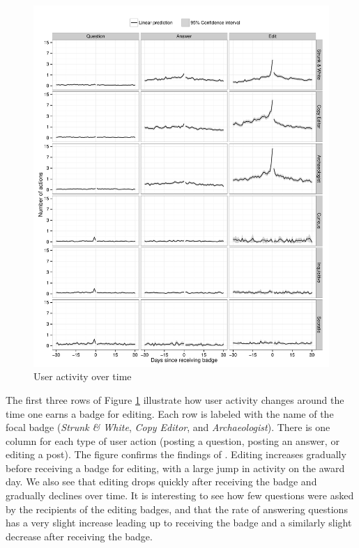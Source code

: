 \documentclass[conference]{IEEEtran}
\newcommand{\1}{\mathds{1}}
\begin{document}
\begin{figure}
  \centering
  \includegraphics[width=\textwidth]{../figures/badges.pdf}
  \caption{User activity over time \label{fig:badges}}
\end{figure}

The first three rows of Figure \ref{fig:badges} illustrate how user activity changes around the time one earns a badge for editing. Each row is labeled with the name of the focal badge (\textit{Strunk \& White}, \textit{Copy Editor}, and \textit{Archaeologist}). There is one column for each type of user action (posting a question, posting an answer, or editing a post). The figure confirms the findings of \citet{Grant2013}. Editing increases gradually before receiving a badge for editing, with a large jump in activity on the award day. We also see that editing drops quickly after receiving the badge and gradually declines over time. It is interesting to see how few questions were asked by the recipients of the editing badges, and that the rate of answering questions has a very slight increase leading up to receiving the badge and a similarly slight decrease after receiving the badge.
\end{document}
